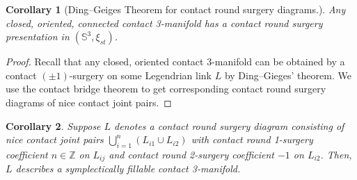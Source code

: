 \documentclass{amsart}
\theoremstyle{plain}
\newtheorem{cor}{Corollary}
\theoremstyle{remark}
\theoremstyle{definition}
\newcommand{\s}{\mathbb{S}}
\begin{document}
\begin{cor}[Ding--Geiges Theorem for contact round surgery diagrams.]\label{cor: DGThmForCRSD}
Any closed, oriented, connected contact 3-manifold has a contact round surgery presentation in $\left(\s^3, \xi_{st}\right)$.
\end{cor}

\begin{proof}
    Recall that any closed, oriented contact 3-manifold can be obtained by a contact $(\pm1)$-surgery on some Legendrian link $L$ by Ding--Gieges' theorem. 
    We use the contact bridge theorem to get corresponding contact round surgery diagrams of nice contact joint pairs. 
\end{proof}


\begin{cor}
    Suppose $L$ denotes a contact round surgery diagram consisting of nice contact joint pairs $\bigcup_{i=1}^{n}(L_{i1}\cup L_{i2})$ with contact round 1-surgery coefficient $n\in \mathbb{Z}$ on $L_{ij}$ and contact round 2-surgery coefficient $-1$ on $L_{i2}$. Then, $L$ describes a symplectically fillable contact 3-manifold.  
\end{cor}
\end{document}
